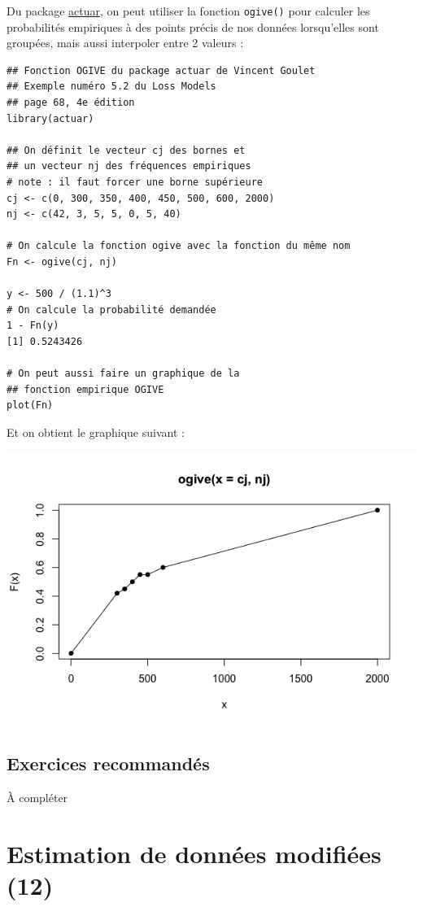 \documentclass[12pt, french]{report}
\begin{document}
\begin{exemple}
Du package \href{https://cran.r-project.org/web/packages/actuar/actuar.pdf}{actuar}, on peut utiliser la fonction \texttt{ogive()} pour calculer les probabilités empiriques à des points précis de nos données lorsqu'elles sont groupées, mais aussi interpoler entre 2 valeurs : 
\begin{verbatim}
## Fonction OGIVE du package actuar de Vincent Goulet
## Exemple numéro 5.2 du Loss Models
## page 68, 4e édition
library(actuar)

## On définit le vecteur cj des bornes et
## un vecteur nj des fréquences empiriques
# note : il faut forcer une borne supérieure
cj <- c(0, 300, 350, 400, 450, 500, 600, 2000)
nj <- c(42, 3, 5, 5, 0, 5, 40)

# On calcule la fonction ogive avec la fonction du même nom
Fn <- ogive(cj, nj)

y <- 500 / (1.1)^3
# On calcule la probabilité demandée
1 - Fn(y)
[1] 0.5243426

# On peut aussi faire un graphique de la
## fonction empirique OGIVE
plot(Fn)
\end{verbatim}
Et on obtient le graphique suivant : 
\begin{center}
\includegraphics[scale=0.5]{Figures/R-ogive-plot.png}
\end{center}
\end{exemple}

\section{Exercices recommandés}
À compléter


\chapter{Estimation de données modifiées (12)}
\end{document}
